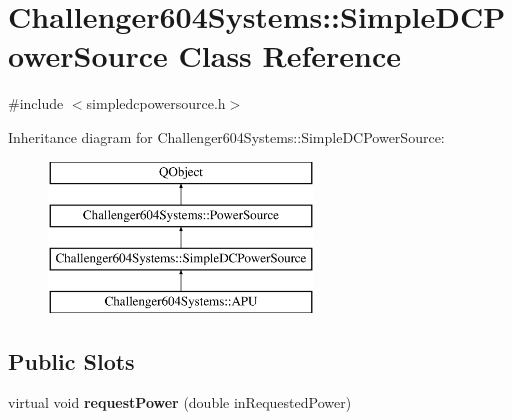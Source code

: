 \hypertarget{class_challenger604_systems_1_1_simple_d_c_power_source}{\section{Challenger604\-Systems\-:\-:Simple\-D\-C\-Power\-Source Class Reference}
\label{class_challenger604_systems_1_1_simple_d_c_power_source}
}


{\ttfamily \#include $<$simpledcpowersource.\-h$>$}

Inheritance diagram for Challenger604\-Systems\-:\-:Simple\-D\-C\-Power\-Source\-:\begin{figure}[H]
\begin{center}
\leavevmode
\includegraphics[height=4.000000cm]{class_challenger604_systems_1_1_simple_d_c_power_source}
\end{center}
\end{figure}
\subsection*{Public Slots}
\begin{DoxyCompactItemize}
\item 
\hypertarget{class_challenger604_systems_1_1_simple_d_c_power_source_a7af4e82286499ec04189398fa14b7b9f}{virtual void {\bfseries request\-Power} (double in\-Requested\-Power)}\label{class_challenger604_systems_1_1_simple_d_c_power_source_a7af4e82286499ec04189398fa14b7b9f}

\end{DoxyCompactItemize}
